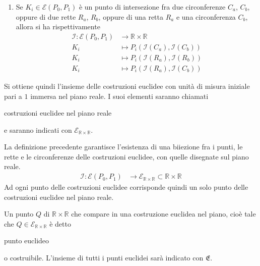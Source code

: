 \begin{definizione}
\begin{enumerate}
\item Se $K_{i} \in \mathcal{E}(P_0,P_1)$ è un punto di intersezione fra due circonferenze $C_{a}$, $C_{b}$, oppure di due rette $R_{a}$, $R_{b}$, oppure di una retta $R_{a}$ e una circonferenza $C_{b}$, allora si ha rispettivamente
\begin{align*} 
\mathcal{I}:  \mathcal{E}(P_0,P_1) & \longrightarrow \mathbb{R}\times\mathbb{R} \\
K_{i}  & \longmapsto P_{i} ( \mathcal{I}(C_{a}),   \mathcal{I}(C_{b})) \\
K_{i}  & \longmapsto P_{i} ( \mathcal{I}(R_{a}),   \mathcal{I}(R_{b})) \\
K_{i}  & \longmapsto P_{i} ( \mathcal{I}(R_{a}),   \mathcal{I}(C_{b})) 
\end{align*}
\end{enumerate}

Si ottiene quindi l'insieme delle costruzioni euclidee con unità di misura iniziale pari a $1$ immersa nel piano reale. I suoi elementi saranno chiamati \begin{bfseries}costruzioni euclidee nel piano reale\end{bfseries} e saranno indicati con $\mathcal{E}_{\mathbb{R}\times\mathbb{R}}$. 
\end{definizione} 

\begin{osservazione}
La definizione precedente garantisce l'esistenza di una biiezione fra i punti, le rette e le circonferenze  delle costruzioni euclidee, con quelle disegnate sul piano reale.
\begin{align*}
\mathcal{I}:  \mathcal{E}(P_0,P_1) & \longrightarrow   \mathcal{E}_{\mathbb{R}\times\mathbb{R}} \subset \mathbb{R}\times\mathbb{R} 
\end{align*}
Ad ogni punto delle costruzioni euclidee corrisponde quindi un solo punto delle costruzioni euclidee nel piano reale.
\end{osservazione}

\begin{definizione}
Un punto $Q$ di $\mathbb{R}\times\mathbb{R}$ che compare in una costruzione euclidea nel piano, cioè tale che $Q \in \mathcal{E}_{\mathbb{R}\times\mathbb{R}}$ è detto \begin{bfseries}punto euclideo\end{bfseries}  o costruibile. L'insieme di tutti i punti euclidei sarà indicato con $\mathfrak{E}$.
\end{definizione}

